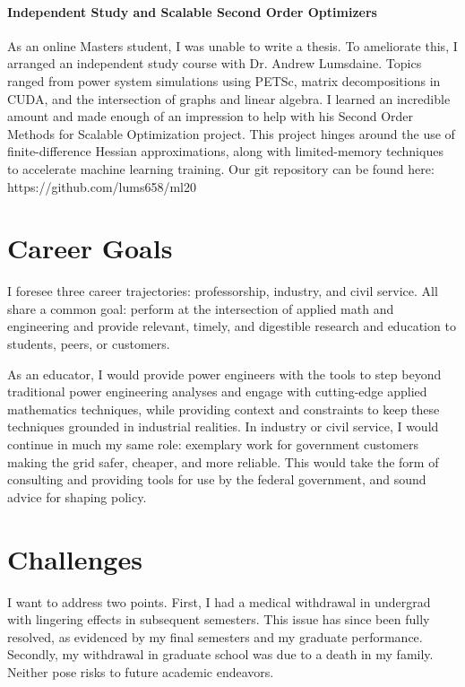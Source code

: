 \documentclass[letterpaper]{article}
\begin{document}
\paragraph{Independent Study and Scalable Second Order Optimizers}
As an online Masters student, I was unable to write a thesis. To ameliorate this, I arranged an
independent study course with Dr. Andrew Lumsdaine.
Topics ranged from power system simulations using PETSc, matrix decompositions in CUDA, and the
intersection of graphs and linear algebra. I learned an incredible amount and made enough of an
impression to help with his Second Order Methods for Scalable Optimization project. This project
hinges around the use of finite-difference Hessian approximations, along with limited-memory
techniques to accelerate machine learning training. Our git repository can be found here:
https://github.com/lums658/ml20

\section*{Career Goals}
I foresee three career trajectories: professorship, industry, and civil service.
All share a common goal: perform at the intersection of applied math and engineering
and provide relevant, timely, and digestible research and education to students,
peers, or customers.

As an educator, I would provide power engineers with the tools
to step beyond traditional power engineering analyses and engage with cutting-edge applied
mathematics techniques, while providing context and constraints to keep these techniques grounded in
industrial realities.  In industry or civil service, I would continue in much my same role:
exemplary work for government customers making the grid safer, cheaper, and more reliable.
This would take the form of consulting and providing tools for use by the federal
government, and sound advice for shaping policy.

\section*{Challenges}
I want to address two points. First, I had a medical withdrawal in undergrad with lingering
effects in subsequent semesters. This issue has since been fully resolved, as evidenced
by my final semesters and my graduate performance. Secondly, my withdrawal in graduate school was
due to a death in my family. Neither pose risks to future academic endeavors.
\end{document}
